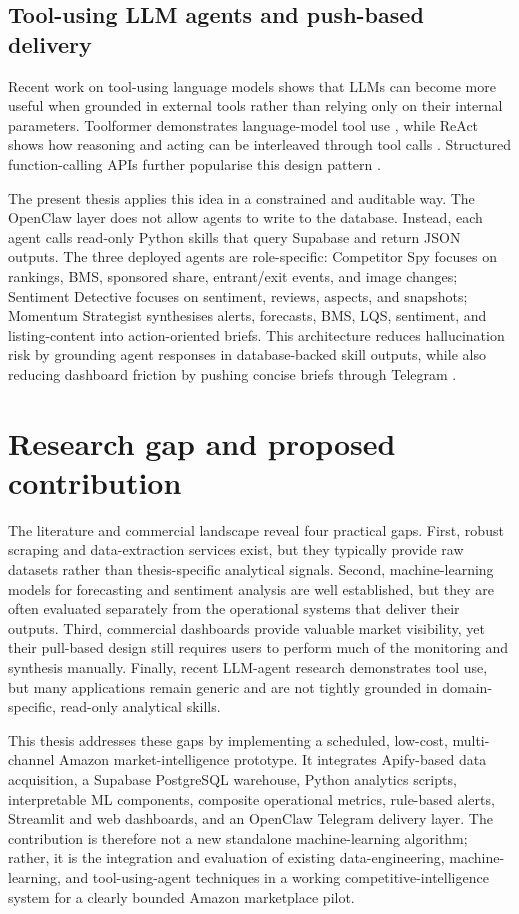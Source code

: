 \subsection{Tool-using LLM agents and push-based delivery}

Recent work on tool-using language models shows that LLMs can become
more useful when grounded in external tools rather than relying only on
their internal parameters. Toolformer demonstrates language-model tool
use \citep{schick2023toolformer}, while ReAct shows how reasoning and
acting can be interleaved through tool calls \citep{yao2022react}.
Structured function-calling APIs further popularise this design pattern
\citep{openai2023functions}.

The present thesis applies this idea in a constrained and auditable way.
The OpenClaw layer does not allow agents to write to the database.
Instead, each agent calls read-only Python skills that query Supabase and
return JSON outputs. The three deployed agents are role-specific:
Competitor Spy focuses on rankings, BMS, sponsored share, entrant/exit
events, and image changes; Sentiment Detective focuses on sentiment,
reviews, aspects, and snapshots; Momentum Strategist synthesises alerts,
forecasts, BMS, LQS, sentiment, and listing-content into action-oriented briefs. This
architecture reduces hallucination risk by grounding agent responses in
database-backed skill outputs, while also reducing dashboard friction by
pushing concise briefs through Telegram \citep{telegram2024bot}.

\section{Research gap and proposed contribution}

The literature and commercial landscape reveal four practical gaps.
First, robust scraping and data-extraction services exist, but they
typically provide raw datasets rather than thesis-specific analytical
signals. Second, machine-learning models for forecasting and sentiment
analysis are well established, but they are often evaluated separately
from the operational systems that deliver their outputs. Third,
commercial dashboards provide valuable market visibility, yet their
pull-based design still requires users to perform much of the monitoring
and synthesis manually. Finally, recent LLM-agent research demonstrates
tool use, but many applications remain generic and are not tightly
grounded in domain-specific, read-only analytical skills.

This thesis addresses these gaps by implementing a scheduled, low-cost,
multi-channel Amazon market-intelligence prototype. It integrates
Apify-based data acquisition, a Supabase PostgreSQL warehouse, Python
analytics scripts, interpretable ML components, composite operational
metrics, rule-based alerts, Streamlit and web dashboards, and an
OpenClaw Telegram delivery layer. The contribution is therefore not a
new standalone machine-learning algorithm; rather, it is the integration
and evaluation of existing data-engineering, machine-learning, and
tool-using-agent techniques in a working competitive-intelligence system
for a clearly bounded Amazon marketplace pilot.
